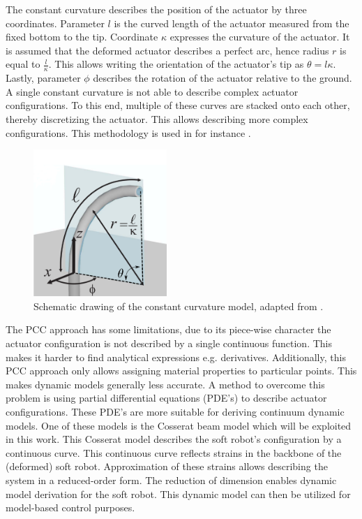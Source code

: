 The constant curvature describes the position of the actuator by three coordinates. Parameter $l$ is the curved length of the actuator measured from the fixed bottom to the tip. Coordinate $\kappa$ expresses the curvature of the actuator. It is assumed that the deformed actuator describes a perfect arc, hence radius $r$ is equal to $\frac{l}{\kappa}$. This allows writing the orientation of the actuator's tip as $\theta = l\kappa$. Lastly, parameter $\phi$ describes the rotation of the actuator relative to the ground. A single constant curvature is not able to describe complex actuator configurations. To this end, multiple of these curves are stacked onto each other, thereby discretizing the actuator. This allows describing more complex configurations. This methodology is used in for instance \cite{Falkenhahn2015}.



\begin{figure}[H]
    \centering
    \includegraphics[width = 0.45\textwidth]{Figures/Chapter1/ccapproach2.png}
    \caption{Schematic drawing of the constant curvature model, adapted from \cite{ccapproach}.}
    \label{fig2:ccapproach}
\end{figure}

The PCC approach has some limitations, due to its piece-wise character the actuator configuration is not described by a single continuous function. This makes it harder to find analytical expressions e.g. derivatives. Additionally, this PCC approach only allows assigning material properties to particular points. This makes dynamic models generally less accurate. A method to overcome this problem is using partial differential equations (PDE's) to describe actuator configurations. These PDE's are more suitable for deriving continuum dynamic models. One of these models is the Cosserat beam model which will be exploited in this work. This Cosserat model describes the soft robot's configuration by a continuous curve. This continuous curve reflects strains in the backbone of the (deformed) soft robot. Approximation of these strains allows describing the system in a reduced-order form. The reduction of dimension enables dynamic model derivation for the soft robot. This dynamic model can then be utilized for model-based control purposes.


